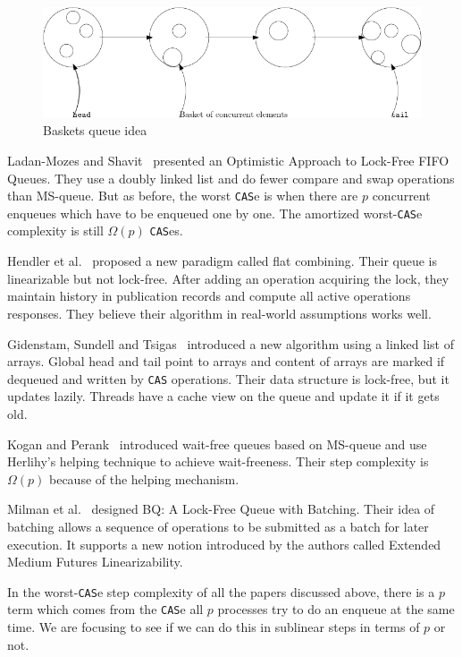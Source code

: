 \documentclass[12pt]{article}
\begin{document}
\begin{figure}[hbt]
  \center\includegraphics[scale=0.3]{pics/baskets}
  \caption{Baskets queue idea}
\end{figure}

Ladan-Mozes and Shavit~\cite{DBLP:journals/dc/Ladan-MozesS08} presented an Optimistic Approach to Lock-Free FIFO Queues. They use a doubly linked list and do fewer compare and swap operations than MS-queue. But as before, the worst \texttt{CAS}e is when there are $p$ concurrent enqueues which have to be enqueued one by one. The amortized worst-\texttt{CAS}e complexity is still $\Omega(p)$ \texttt{CAS}es.

Hendler et al.~\cite{DBLP:conf/spaa/HendlerIST10} proposed a new paradigm called flat combining. Their queue is linearizable but not lock-free. After adding an operation acquiring the lock, they maintain history in publication records and compute all active operations responses. They believe their algorithm in real-world assumptions works well.

Gidenstam, Sundell and Tsigas~\cite{DBLP:conf/opodis/GidenstamST10} introduced a new algorithm using a linked list of arrays. Global head and tail point to arrays and content of arrays are marked if dequeued and written by \texttt{CAS} operations. Their data structure is lock-free, but it updates lazily. Threads have a cache view on the queue and update it if it gets old.

Kogan and Perank~\cite{DBLP:conf/ppopp/KoganP11} introduced wait-free queues based on MS-queue and use Herlihy's helping technique to achieve wait-freeness. Their step complexity is $\Omega(p)$ because of the helping mechanism.

Milman et al.~\cite{DBLP:conf/spaa/MilmanKLLP18} designed BQ: A Lock-Free Queue with Batching. Their idea of batching allows a sequence of operations to be submitted as a batch for later execution. It supports a new notion introduced by the authors called Extended Medium Futures Linearizability.

In the worst-\texttt{CAS}e step complexity of all the papers discussed above, there is a $p$ term which comes from the \texttt{CAS}e all $p$ processes try to do an enqueue at the same time. We are focusing to see if we can do this in sublinear steps in terms of $p$ or not.
\end{document}
